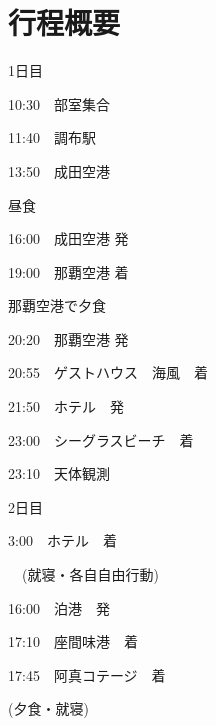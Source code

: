 \documentclass[../main]{subfiles}
\begin{document}
\section{行程概要}
\begin{multicols}{2}
  \small
  \begin{itembox}[l]{1日目}
    \begin{description}
        \item 10:30　部室集合
        \item 11:40　調布駅
        \item 13:50　成田空港
        \item 昼食
        \item 16:00　成田空港 発
        \item 19:00　那覇空港 着
        \item 那覇空港で夕食
        \item 20:20　那覇空港 発
        \item 20:55　ゲストハウス　海風　着
        \item 21:50　ホテル　発
        \item 23:00　シーグラスビーチ　着
        \item 23:10　天体観測
    \end{description}
  \end{itembox}
  \begin{itembox}[l]{2日目}
    \begin{description}
        \item  3:00　ホテル　着
        \item　(就寝・各自自由行動)
        \item 16:00　泊港　発
        \item 17:10　座間味港　着
        \item 17:45　阿真コテージ　着
        \item (夕食・就寝)
    \end{description}
  \end{itembox}
\end{multicols}
\end{document}
